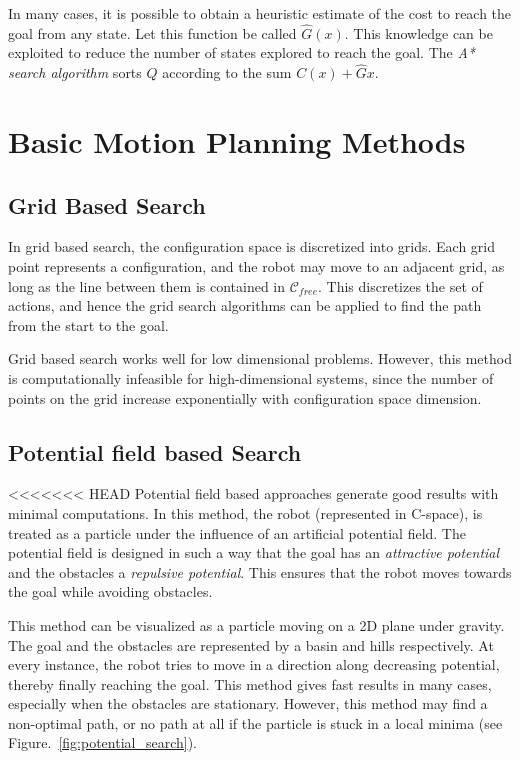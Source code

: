 In many cases, it is possible to obtain a heuristic estimate of the cost to reach the goal from any state. Let this function be called $\hat{G}(x)$. This knowledge can be exploited to reduce the number of states explored to reach the goal. The \textit{A* search algorithm} sorts $Q$ according to the sum $C(x) + \hat{G}{x}$.


\section{Basic Motion Planning Methods}

\subsection{Grid Based Search}
In grid based search, the configuration space is discretized into grids. Each grid point represents a configuration, and the robot may move to an adjacent grid, as long as the line between them is contained in $\mathcal{C}_{free}$. This discretizes the set of actions, and hence the grid search algorithms can be applied to find the path from the start to the goal. 

Grid based search works well for low dimensional problems. However, this method is computationally infeasible for high-dimensional systems, since the number of points on the grid increase exponentially with configuration space dimension. 
\subsection{Potential field based Search}
<<<<<<< HEAD
\label{sec:pot_search}
Potential field based approaches generate good results with minimal computations. In this method, the robot (represented in C-space), is treated as a particle under the influence of an artificial potential field. The potential field is designed in such a way that the goal has an \textit{attractive potential} and the obstacles a \textit{repulsive potential}. This ensures that the robot moves towards the goal while avoiding obstacles. 

This method can be visualized as a particle moving on a 2D plane under gravity. The goal and the obstacles are represented by a basin and hills respectively. At every instance, the robot tries to move in a direction along decreasing potential, thereby finally reaching the goal. This method gives fast results in many cases, especially when the obstacles are stationary. However, this method may find a non-optimal path, or no path at all if the particle is stuck in a local minima (see Figure.~\ref{fig:potential_search}).

